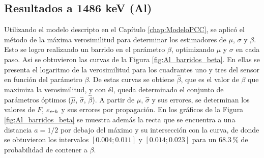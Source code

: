 \subsection{Resultados a 1486 keV (Al)}
\noindent Utilizando el modelo descripto en el Capítulo \ref{chap:ModeloPCC}, se aplicó el método de la máxima verosimilitud para determinar los estimadores de $\mu$, $\sigma$ y $\beta$. Esto se logro realizando un barrido en el parámetro $\beta$, optimizando $\mu$ y $\sigma$ en cada paso. Asi se obtuvieron las curvas de la Figura \ref{fig:Al_barridos_beta}. En ellas se presenta el logaritmo de la verosimilitud para los cuadrantes uno y tres del sensor en función del parámetro $\beta$. 
De estas curvas se obtiene $\hat{\beta}$, que es el valor de $\beta$ que maximiza la verosimilitud, y con él, queda determinado el conjunto de parámetros óptimos ($\hat{\mu}$, $\hat{\sigma}$, $\hat{\beta}$). A partir de $\hat{\mu}$, $\hat{\sigma}$ y sus errores, se determinan los valores de $F$, $\varepsilon_{e\mbox{-}h}$ y sus errores por propagación. En los gráficos de la Figura \ref{fig:Al_barridos_beta} se muestra además la recta que se encuentra a una distancia $a=1/2$ por debajo del máximo y su intersección con la curva, de donde se obtuvieron los intervalos $[0.004; 0.011]$ y $[0.014; 0.023]$ para un $68.3\,\%$ de probabilidad de contener a $\beta$.

